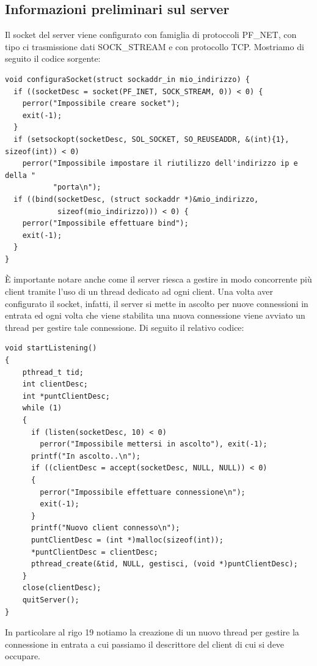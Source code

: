\documentclass[a4paper]{article}
\begin{document}
\subsection{Informazioni preliminari sul server}
Il socket del server viene configurato con famiglia di protoccoli PF\_NET, con tipo ci trasmissione dati SOCK\_STREAM e con protocollo TCP. Mostriamo di seguito il codice sorgente:
\begin{lstlisting}
void configuraSocket(struct sockaddr_in mio_indirizzo) {
  if ((socketDesc = socket(PF_INET, SOCK_STREAM, 0)) < 0) {
    perror("Impossibile creare socket");
    exit(-1);
  }
  if (setsockopt(socketDesc, SOL_SOCKET, SO_REUSEADDR, &(int){1}, sizeof(int)) < 0)
    perror("Impossibile impostare il riutilizzo dell'indirizzo ip e della "
           "porta\n");
  if ((bind(socketDesc, (struct sockaddr *)&mio_indirizzo,
            sizeof(mio_indirizzo))) < 0) {
    perror("Impossibile effettuare bind");
    exit(-1);
  }
}
\end{lstlisting}
È importante notare anche come il server riesca a gestire in modo concorrente più client tramite l'uso di un thread dedicato ad ogni client. 
Una volta aver configurato il socket, infatti,  il server si mette in ascolto per nuove connessioni in entrata ed ogni volta che
viene stabilita una nuova connessione viene avviato un thread per gestire tale connessione. Di seguito il relativo codice: 
\begin{lstlisting}
void startListening()
{
    pthread_t tid;
    int clientDesc;
    int *puntClientDesc;
    while (1)
    {
      if (listen(socketDesc, 10) < 0)
        perror("Impossibile mettersi in ascolto"), exit(-1);
      printf("In ascolto..\n");
      if ((clientDesc = accept(socketDesc, NULL, NULL)) < 0)
      {
        perror("Impossibile effettuare connessione\n");
        exit(-1);
      }
      printf("Nuovo client connesso\n");
      puntClientDesc = (int *)malloc(sizeof(int));
      *puntClientDesc = clientDesc;
      pthread_create(&tid, NULL, gestisci, (void *)puntClientDesc);
    }
    close(clientDesc);
    quitServer();
}
\end{lstlisting}
In particolare al rigo 19 notiamo la creazione di un nuovo thread per gestire la connessione in entrata a cui passiamo il descrittore del client di cui si deve occupare.
\end{document}
